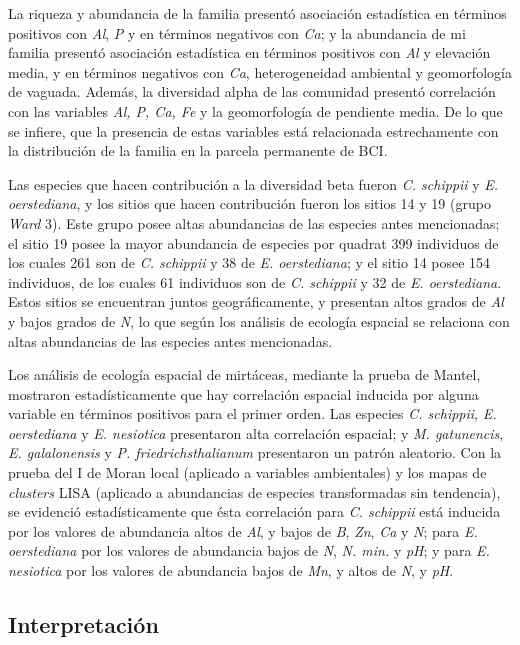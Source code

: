 \documentclass[11pt,]{article}
\begin{document}
La riqueza y abundancia de la familia presentó asociación estadística en
términos positivos con \emph{Al}, \emph{P} y en términos negativos con
\emph{Ca}; y la abundancia de mi familia presentó asociación estadística
en términos positivos con \emph{Al} y elevación media, y en términos
negativos con \emph{Ca}, heterogeneidad ambiental y geomorfología de
vaguada. Además, la diversidad alpha de las comunidad presentó
correlación con las variables \emph{Al, P, Ca, Fe} y la geomorfología de
pendiente media. De lo que se infiere, que la presencia de estas
variables está relacionada estrechamente con la distribución de la
familia en la parcela permanente de BCI.

Las especies que hacen contribución a la diversidad beta fueron \emph{C.
schippii} y \emph{E. oerstediana}, y los sitios que hacen contribución
fueron los sitios 14 y 19 (grupo \emph{Ward} 3). Este grupo posee altas
abundancias de las especies antes mencionadas; el sitio 19 posee la
mayor abundancia de especies por quadrat 399 individuos de los cuales
261 son de \emph{C. schippii} y 38 de \emph{E. oerstediana}; y el sitio
14 posee 154 individuos, de los cuales 61 individuos son de \emph{C.
schippii} y 32 de \emph{E. oerstediana}. Estos sitios se encuentran
juntos geográficamente, y presentan altos grados de \emph{Al} y bajos
grados de \emph{N}, lo que según los análisis de ecología espacial se
relaciona con altas abundancias de las especies antes mencionadas.

Los análisis de ecología espacial de mirtáceas, mediante la prueba de
Mantel, mostraron estadísticamente que hay correlación espacial inducida
por alguna variable en términos positivos para el primer orden. Las
especies \emph{C. schippii}, \emph{E. oerstediana} y \emph{E. nesiotica}
presentaron alta correlación espacial; y \emph{M. gatunencis}, \emph{E.
galalonensis} y \emph{P. friedrichsthalianum} presentaron un patrón
aleatorio. Con la prueba del I de Moran local (aplicado a variables
ambientales) y los mapas de \emph{clusters} LISA (aplicado a abundancias
de especies transformadas sin tendencia), se evidenció estadísticamente
que ésta correlación para \emph{C. schippii} está inducida por los
valores de abundancia altos de \emph{Al}, y bajos de \emph{B},
\emph{Zn}, \emph{Ca} y \emph{N}; para \emph{E. oerstediana} por los
valores de abundancia bajos de \emph{N}, \emph{N. min.} y \emph{pH}; y
para \emph{E. nesiotica} por los valores de abundancia bajos de
\emph{Mn}, y altos de \emph{N}, y \emph{pH}.

\subsection{Interpretación}\label{interpretaciuxf3n}
\end{document}
